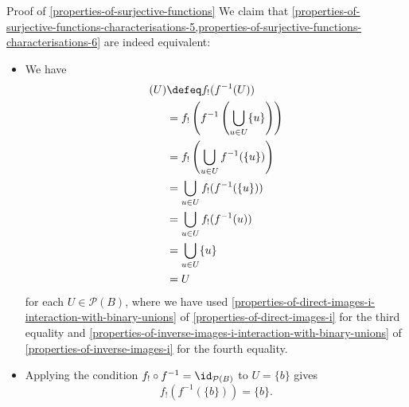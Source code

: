 \begin{Proof}{Proof of \cref{properties-of-surjective-functions}}
    We claim that \cref{properties-of-surjective-functions-characterisations-5,properties-of-surjective-functions-characterisations-6} are indeed equivalent:
    \begin{itemize}
        \item{}We have
            \begin{align*}
                [f_{!}\circ f^{-1}](U) &\defeq f_{!}(f^{-1}(U))\\
                                       &=      f_{!}\left(f^{-1}\left(\bigcup_{u\in U}\{u\}\right)\right)\\
                                       &=      f_{!}\left(\bigcup_{u\in U}f^{-1}(\{u\})\right)\\
                                       &=      \bigcup_{u\in U}f_{!}(f^{-1}(\{u\}))\\
                                       &=      \bigcup_{u\in U}f_{!}(f^{-1}(u))\\
                                       &=      \bigcup_{u\in U}\{u\}\\
                                       &=      U
            \end{align*}
            for each $U\in\mathcal{P}(B)$, where we have used \cref{properties-of-direct-images-i-interaction-with-binary-unions} of \cref{properties-of-direct-images-i} for the third equality and \cref{properties-of-inverse-images-i-interaction-with-binary-unions} of \cref{properties-of-inverse-images-i} for the fourth equality.
        \item{}Applying the condition $f_{!}\circ f^{-1}=\id_{\mathcal{P}(B)}$ to $U=\{b\}$ gives
            \[
                f_{!}(f^{-1}(\{b\}))%
                =%
                \{b\}.%
            \]%
    \end{itemize}


\end{Proof}
